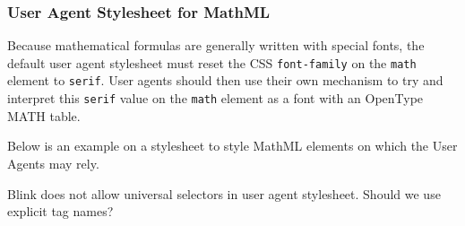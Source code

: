 \subsubsection{User Agent Stylesheet for MathML}\label{UAStylesheet}

Because mathematical formulas are generally written with special fonts, the
default user agent stylesheet must reset the CSS {\tt font-family} on the
{\tt math} element to {\tt serif}. User agents should then use their own
mechanism to try and interpret this {\tt serif} value on the {\tt math} element
as a font with an OpenType MATH table.

Below is an example on a stylesheet to style MathML elements on which the
User Agents may rely.

Blink does not allow universal selectors in user agent
stylesheet. Should we use explicit tag names? 

